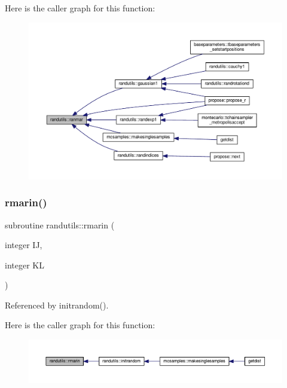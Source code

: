 Here is the caller graph for this function\+:
\nopagebreak
\begin{figure}[H]
\begin{center}
\leavevmode
\includegraphics[width=350pt]{namespacerandutils_a6065ecd619b0a63bceabcecdde031a2c_icgraph}
\end{center}
\end{figure}
\mbox{\label{namespacerandutils_ae91e8d9448da0877857bf6ae466c210d}} 
\subsubsection{\texorpdfstring{rmarin()}{rmarin()}}
{\footnotesize\ttfamily subroutine randutils\+::rmarin (\begin{DoxyParamCaption}\item[{integer}]{IJ,  }\item[{integer}]{KL }\end{DoxyParamCaption})}



Referenced by initrandom().

Here is the caller graph for this function\+:
\nopagebreak
\begin{figure}[H]
\begin{center}
\leavevmode
\includegraphics[width=350pt]{namespacerandutils_ae91e8d9448da0877857bf6ae466c210d_icgraph}
\end{center}
\end{figure}


